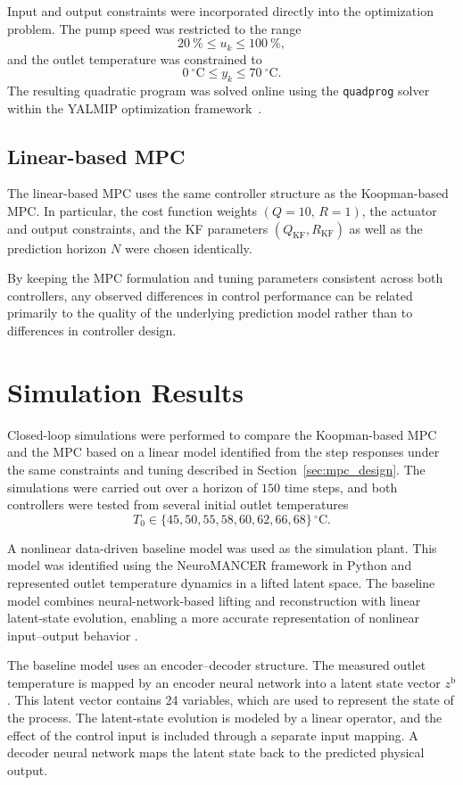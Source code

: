 Input and output constraints were incorporated directly into the optimization problem. The pump speed was restricted to the range
\[
20~\% \leq u_k \leq 100~\%,
\]
and the outlet temperature was constrained to
\[
0~^\circ\mathrm{C} \leq y_k \leq 70~^\circ\mathrm{C}.
\]
The resulting quadratic program was solved online using the \texttt{quadprog} solver within the YALMIP optimization framework \cite{lofberg2004yalmip}.

\subsection{Linear-based MPC}


The linear-based MPC uses the same controller structure as the
Koopman-based MPC. In particular, the cost function weights
$(Q = 10,\, R = 1)$, the actuator and output constraints, and the
KF parameters $(Q_{\mathrm{KF}}, R_{\mathrm{KF}})$ as well as the prediction horizon $N$ were chosen
identically. 

By keeping the MPC formulation and tuning parameters consistent across
both controllers, any observed differences in control performance can be
related primarily to the quality of the underlying prediction model
rather than to differences in controller design.

\section{Simulation Results}
\label{sec:simulation_results}

Closed-loop simulations were performed to compare the Koopman-based MPC and the MPC based on a linear model identified from the step responses under the same constraints and tuning described in Section~\ref{sec:mpc_design}. The simulations were carried out over a horizon of $150$ time steps, and both controllers were tested from several initial outlet temperatures
\[
T_0 \in \{45,50,55,58,60,62,66,68\}\,^{\circ}\mathrm{C}.
\]

A nonlinear data-driven baseline model was used as the simulation plant. This model was identified using the NeuroMANCER framework in Python and represented outlet temperature dynamics in a lifted latent space. The baseline model combines neural-network-based lifting and reconstruction with linear latent-state evolution, enabling a more accurate representation of nonlinear input–output behavior \cite{yeung2019learning, otto2019linearly}.

The baseline model uses an encoder--decoder structure. The measured outlet temperature is mapped by an encoder neural network into a latent state vector $z^{\mathrm{b}}$. This latent vector contains 24 variables, which are used to represent the state of the process. The latent-state evolution is modeled by a linear operator, and the effect of the control input is included through a separate input mapping. A decoder neural network maps the latent state back to the predicted physical output.

